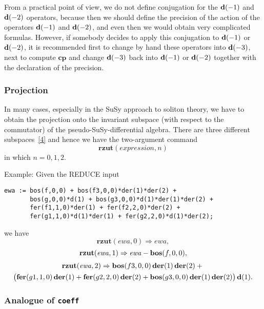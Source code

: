 {From a practical point of view, we do not define conjugation for the
$\mathbf{d}(-1)$ and $\mathbf{d}(-2)$ operators, because then we should define the
precision of the action of the operators $\mathbf{d}(-1)$ and $\mathbf{d}(-2)$, and
even then we would obtain very complicated formulas.  However, if
somebody decides to apply this conjugation to $\mathbf{d}(-1)$ or $\mathbf{d}(-2)$, it
is recommended first to change by hand these operators into $\mathbf{d}(-3)$,
next to compute $\mathbf{cp}$ and change $\mathbf{d}(-3)$ back into $\mathbf{d}(-1)$
or $\mathbf{d}(-2)$ together with the declaration of the precision.

\subsubsection*{Projection}

In many cases, especially in the SuSy approach to soliton theory, we
have to obtain the projection onto the invariant subspace (with
respect to the commutator) of the pseudo-SuSy-differential algebra.
There are three different subspaces~\hyperref[susy2-bib]{[4]} and
hence we have the two-argument command
\begin{equation*}
  \mathbf{rzut}(\mathit{expression},n)
\end{equation*}
in which $n=0,1,2$.

Example: Given the REDUCE input
\begin{verbatim}
ewa := bos(f,0,0) + bos(f3,0,0)*der(1)*der(2) +
       bos(g,0,0)*d(1) + bos(g3,0,0)*d(1)*der(1)*der(2) +
       fer(f1,1,0)*der(1) + fer(f2,2,0)*der(2) +
       fer(g1,1,0)*d(1)*der(1) + fer(g2,2,0)*d(1)*der(2);
\end{verbatim}
we have
\begin{equation*}
  \mathbf{rzut}(\mathit{ewa},0) \Rightarrow \mathit{ewa},
\end{equation*}
\begin{equation*}
  \mathbf{rzut}(\mathit{ewa},1) \Rightarrow \mathit{ewa}-\mathbf{bos}(f,0,0),
\end{equation*}
\begin{multline*}
  \mathbf{rzut}(\mathit{ewa},2) \Rightarrow
  \mathbf{bos}(f3,0,0)\,\mathbf{der}(1)\,\mathbf{der}(2) + \mbox{} \\
  \big( \mathbf{fer}(g1,1,0)\,\mathbf{der}(1) + \mathbf{fer}(g2,2,0)\,\mathbf{der}(2) +
  \mathbf{bos}(g3,0,0)\,\mathbf{der}(1)\,\mathbf{der}(2) \big)\,\mathbf{d}(1).
\end{multline*}

\subsubsection*{Analogue of \texttt{coeff}}

}
